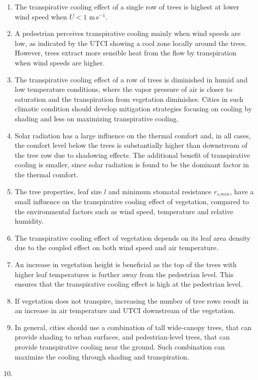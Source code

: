 \begin{enumerate}
\item The transpirative cooling effect of a single row of trees is highest at lower wind speed when $U<1$ m\,s$^{-1}$. 
\item A pedestrian perceives transpirative cooling mainly when wind speeds are low, as indicated by the UTCI showing a cool zone locally around the trees. However, trees extract more sensible heat from the flow by transpiration when wind speeds are higher.
\item The transpirative cooling effect of a row of trees is diminished in humid and low temperature conditions, where the vapor pressure of air is closer to saturation and the transpiration from vegetation diminishes. Cities in such climatic condition should develop mitigation strategies focusing on cooling by shading and less on maximizing transpirative cooling.
\item Solar radiation has a large influence on the thermal comfort and, in all cases, the comfort level below the trees is substantially higher than downstream of the tree row due to shadowing effects. The additional benefit of transpirative cooling is smaller, since solar radiation is found to be the dominant factor in the thermal comfort.  
\item The tree properties, leaf size $l$ and minimum stomatal resistance $r_{\textit{s,min}}$, have a small influence on the transpirative cooling effect of vegetation, compared to the environmental factors such as wind speed, temperature and relative humidity.
\item The transpirative cooling effect of vegetation depends on its leaf area density due to the coupled effect on both wind speed and air temperature. 
\item An increase in vegetation height is beneficial as the top of the trees with higher leaf temperatures is further away from the pedestrian level. This ensures that the transpirative cooling effect is high at the pedestrian level. 
\item If vegetation does not transpire, increasing the number of tree rows result in an increase in air temperature and UTCI downstream of the vegetation.  
\item In general, cities should use a combination of tall wide-canopy trees, that can provide shading to urban surfaces, and pedestrian-level trees, that can provide transpirative cooling near the ground. Such combination can maximize the cooling through shading and transpiration.
\item {}
\end{enumerate}
